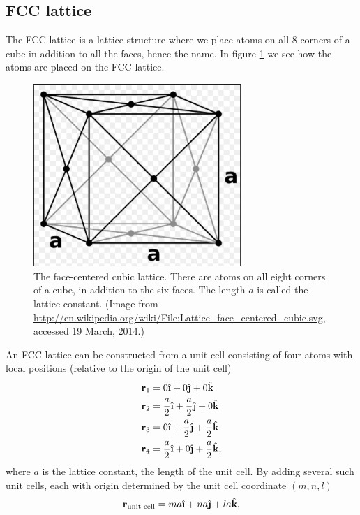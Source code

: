 \subsection{FCC lattice}
The FCC lattice is a lattice structure where we place atoms on all 8 corners of a cube in addition to all the faces, hence the name. In figure \ref{fig:md_fcc} we see how the atoms are placed on the FCC lattice.
\begin{figure}[h!]
\begin{center}
\includegraphics[width=0.7\textwidth, trim=0cm 0cm 0cm 0cm, clip]{MD/figures/fcc.png}
\end{center}
\caption{The face-centered cubic lattice. There are atoms on all eight corners of a cube, in addition to the six faces. The length $a$ is called the lattice constant. (Image from \url{http://en.wikipedia.org/wiki/File:Lattice_face_centered_cubic.svg}, accessed 19 March, 2014.)}
\label{fig:md_fcc}
\end{figure}
An FCC lattice can be constructed from a unit cell consisting of four atoms with local positions (relative to the origin of the unit cell)
\begin{align}
	\vec r_1 &= 0\ihat + 0 \jhat + 0 \khat\\
	\vec r_2 &= \frac{a}{2}\ihat + \frac{a}{2} \jhat + 0 \khat\\
	\vec r_3 &= 0\ihat + \frac{a}{2} \jhat + \frac{a}{2} \khat\\
	\vec r_4 &= \frac{a}{2}\ihat + 0 \jhat + \frac{a}{2} \khat,
\end{align}
where $a$ is the lattice constant, the length of the unit cell. By adding several such unit cells, each with origin determined by the unit cell coordinate $(m,n,l)$
\begin{align}
	\vec r_\text{unit cell} = ma\ihat + na\jhat + la\khat,
\end{align}
